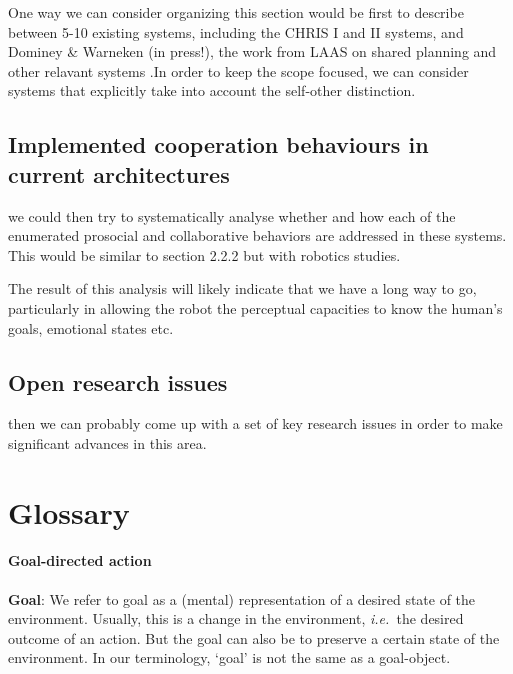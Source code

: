 \documentclass{article}
\newcommand{\ie}{{\textit{i.e.~}}}
\begin{document}
One way we can consider organizing this section would be first to describe
between 5-10 existing systems, including the CHRIS I and II systems, and
Dominey \& Warneken (in press!), the work from LAAS on shared planning and other
relavant systems .In order to keep the scope focused, we can consider systems
that explicitly take into account the self-other distinction.

\subsection{Implemented cooperation behaviours in current architectures}

we could then try to systematically analyse whether and how each of the
enumerated prosocial and collaborative behaviors are addressed in these
systems.  This would be similar to section 2.2.2 but with robotics studies.

The result of this analysis will likely indicate that we have a long way to go,
particularly in allowing the robot the perceptual capacities to know the
human's goals, emotional states etc.

\subsection{Open research issues}

then we can probably come up with a set of key research issues in order to make
significant advances in this area.

\section{Glossary}

\paragraph{Goal-directed action}

\textbf{Goal}: We refer to goal as a (mental) representation of a desired state
of the environment. Usually, this is a change in the environment, \ie the
desired outcome of an action. But the goal can also be to preserve a certain
state of the environment. In our terminology, `goal' is not the same as a
goal-object. 
\end{document}
